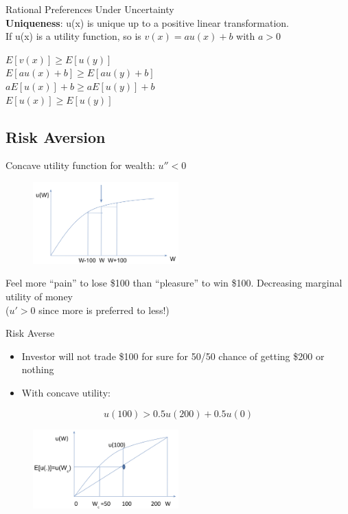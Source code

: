 \documentclass[
14pt,notheorems,hyperref={pdfauthor=whatever}
]{beamer}
\begin{document}
\begin{frame}
Rational Preferences Under Uncertainty\\
\hfill \break
\textbf{Uniqueness}: u(x) is unique up to a positive linear transformation.\\
\hfill \break
If u(x) is a utility function, so is $v(x)=au(x)+b$ with $a>0$ \\
\begin{center}
    $E[v(x)] \geq E[u(y)]$\\
    $E[au(x)+b] \geq E[au(y)+b]$\\
    $aE[u(x)]+b \geq aE[u(y)]+b$\\
    $E[u(x)] \geq E[u(y)]$\\
\end{center}
\end{frame}


\subsection{Risk Aversion}

\begin{frame}
Concave utility function for wealth: $u''<0$\\
\begin{figure}[l1-concave]
    \includegraphics[width=0.5\textwidth]{L1-concave}
    \centering
\end{figure}
\hfill \break
Feel more “pain” to lose \$100 than “pleasure” to win \$100. Decreasing marginal utility of money\\
\hfill \break
($u'>0$ since more is preferred to less!)\\
\end{frame}

\begin{frame}
Risk Averse\\
\hfill \break
\begin{itemize}
    \item Investor will not trade \$100 for sure for 50/50 chance of getting \$200 or nothing
    \item With concave utility:
\end{itemize}
\[ u(100) > 0.5 u(200) + 0.5 u(0)\]
\begin{figure}[l1-ra]
    \includegraphics[width=0.5\textwidth]{L1-riskaversion}
    \centering
\end{figure}
\end{frame}
\end{document}
